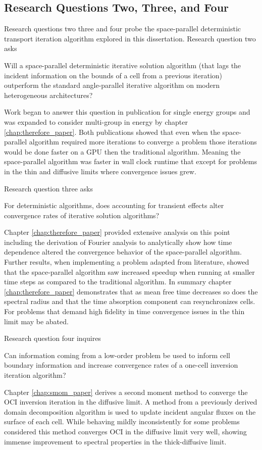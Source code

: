 \subsection{Research Questions Two, Three, and Four}

Research questions two three and four probe the space-parallel deterministic transport iteration algorithm explored in this dissertation.
Research question two asks
\begin{displayquote}
Will a space-parallel deterministic iterative solution algorithm (that lags the incident information on the bounds of a cell from a previous iteration) outperform the standard angle-parallel iterative algorithm on modern heterogeneous architectures?
\end{displayquote}
Work began to answer this question in publication \cite{morgan2023oci} for single energy groups and was expanded to consider multi-group in energy by chapter \ref{chap:therefore_paper}.
Both publications showed that even when the space-parallel algorithm required more iterations to converge a problem those iterations would be done faster on a GPU then the traditional algorithm.
Meaning the space-parallel algorithm was faster in wall clock runtime that except for problems in the thin and diffusive limits where convergence issues grew.

Research question three asks
\begin{displayquote}
For deterministic algorithms, does accounting for transient effects alter convergence rates of iterative solution algorithms?
\end{displayquote}
Chapter \ref{chap:therefore_paper} provided extensive analysis on this point including the derivation of Fourier analysis to analytically show how time dependence altered the convergence behavior of the space-parallel algorithm.
Further results, when implementing a problem adapted from literature, showed that the space-parallel algorithm saw increased speedup when running at smaller time steps as compared to the traditional algorithm.
In summary chapter \ref{chap:therefore_paper} demonstrates that as mean free time decreases so does the spectral radius and that the time absorption component can resynchronizes cells.
For problems that demand high fidelity in time convergence issues in the thin limit may be abated.

Research question four inquires
\begin{displayquote}
Can information coming from a low-order problem be used to inform cell boundary information and increase convergence rates of a one-cell inversion iteration algorithm?
\end{displayquote}
Chapter \ref{chap:smom_paper} derives a second moment method to converge the OCI inversion iteration in the diffusive limit.
A method from a previously derived domain decomposition algorithm is used to update incident angular fluxes on the surface of each cell.
While behaving mildly inconsistently for some problems considered this method converges OCI in the diffusive limit very well, showing immense improvement to spectral properties in the thick-diffusive limit.



